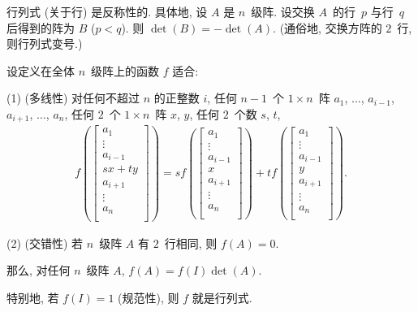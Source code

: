 \documentclass[../libro.tex]{subfiles}
\begin{document}
\begin{theorem}[反称性]
    行列式 (关于行) 是反称性的.
    具体地,
    设 \(A\) 是 \(n\)~级阵.
    设交换 \(A\)~的行~\(p\) 与行~\(q\) 后得到的阵为 \(B\)
    (\(p < q\)).
    则 \(\det {(B)} = -\det {(A)}\).
    (通俗地, 交换方阵的 \(2\)~行, 则行列式变号.)
\end{theorem}

\begin{theorem}
    设定义在全体 \(n\)~级阵上的函数 \(f\) 适合:

    (1)
    (多线性)
    对任何不超过 \(n\) 的正整数 \(i\),
    任何 \(n-1\)~个 \(1 \times n\)~阵
    \(a_1\), \(\dots\), \(a_{i-1}\),
    \(a_{i+1}\), \(\dots\), \(a_n\),
    任何 \(2\)~个 \(1 \times n\)~阵 \(x\), \(y\),
    任何 \(2\)~个数 \(s\), \(t\),
    \begin{align*}
        f
        {\left(
                \begin{bmatrix}
                    a_1     \\
                    \vdots  \\
                    a_{i-1} \\
                    sx + ty \\
                    a_{i+1} \\
                    \vdots  \\
                    a_{n}   \\
        \end{bmatrix}\right)}
        =
        s
        f
        {\left(
                \begin{bmatrix}
                    a_1     \\
                    \vdots  \\
                    a_{i-1} \\
                    x       \\
                    a_{i+1} \\
                    \vdots  \\
                    a_{n}   \\
        \end{bmatrix}\right)}
        +
        t
        f
        {\left(
                \begin{bmatrix}
                    a_1     \\
                    \vdots  \\
                    a_{i-1} \\
                    y       \\
                    a_{i+1} \\
                    \vdots  \\
                    a_{n}   \\
        \end{bmatrix}\right)}.
    \end{align*}

    (2)
    (交错性)
    若 \(n\)~级阵 \(A\) 有 \(2\)~行相同,
    则 \(f(A) = 0\).

    那么, 对任何 \(n\)~级阵 \(A\),
    \(f(A) = f(I) \det {(A)}\).

    特别地, 若 \(f(I) = 1\) (规范性),
    则 \(f\) 就是行列式.
\end{theorem}
\end{document}
